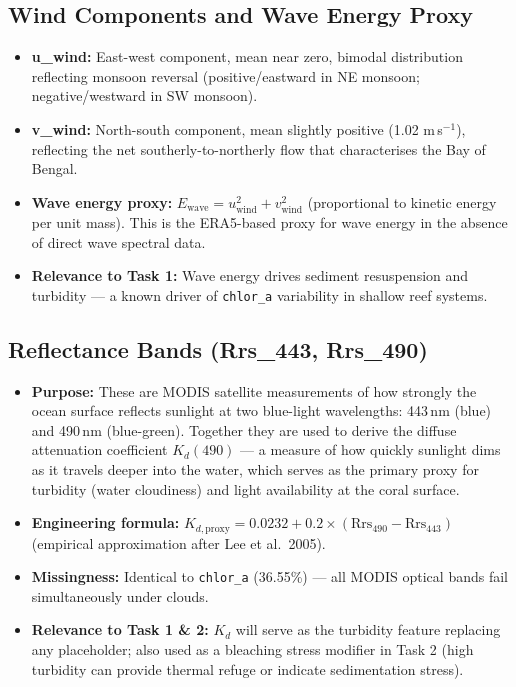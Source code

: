 \documentclass[12pt,a4paper]{report}
\begin{document}
\subsection{Wind Components and Wave Energy Proxy}

\begin{itemize}[leftmargin=*]
  \item \textbf{u\_wind:} East-west component, mean near zero, bimodal distribution
    reflecting monsoon reversal (positive/eastward in NE monsoon; negative/westward
    in SW monsoon).
  \item \textbf{v\_wind:} North-south component, mean slightly positive (1.02 m\,s$^{-1}$),
    reflecting the net southerly-to-northerly flow that characterises the Bay of Bengal.
  \item \textbf{Wave energy proxy:} $E_{\text{wave}} = u_{\text{wind}}^2 + v_{\text{wind}}^2$
    (proportional to kinetic energy per unit mass). This is the ERA5-based proxy for
    wave energy in the absence of direct wave spectral data.
  \item \textbf{Relevance to Task 1:} Wave energy drives sediment resuspension and
    turbidity — a known driver of \texttt{chlor\_a} variability in shallow reef systems.
\end{itemize}

\subsection{Reflectance Bands (Rrs\_443, Rrs\_490)}

\begin{itemize}[leftmargin=*]
  \item \textbf{Purpose:} These are MODIS satellite measurements of how strongly
    the ocean surface reflects sunlight at two blue-light wavelengths: 443\,nm (blue)
    and 490\,nm (blue-green). Together they are used to derive the diffuse attenuation
    coefficient $K_d(490)$ — a measure of how quickly sunlight dims as it travels
    deeper into the water, which serves as the primary proxy for turbidity (water
    cloudiness) and light availability at the coral surface.
  \item \textbf{Engineering formula:}
    $K_{d,\text{proxy}} = 0.0232 + 0.2 \times (\text{Rrs}_{490} - \text{Rrs}_{443})$
    (empirical approximation after Lee et al.\ 2005).
  \item \textbf{Missingness:} Identical to \texttt{chlor\_a} (36.55\%) — all MODIS
    optical bands fail simultaneously under clouds.
  \item \textbf{Relevance to Task 1 \& 2:} $K_d$ will serve as the turbidity feature
    replacing any placeholder; also used as a bleaching stress modifier in Task 2
    (high turbidity can provide thermal refuge or indicate sedimentation stress).
\end{itemize}
\end{document}
